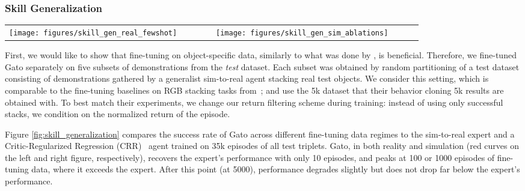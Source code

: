 \documentclass[10pt]{article} \usepackage[accepted]{tmlr}
\newcommand{\model}{{Gato}}
\begin{document}
\subsubsection*{Skill Generalization}
\begin{figure*}[t]
    \vskip -0.5cm
    \centering
    \begin{tabular}{p{0.4\linewidth} p{0.4\linewidth}}
    \vspace{0pt} \texttt{[image: figures/skill\_gen\_real\_fewshot]} &
    \vspace{0pt} \texttt{[image: figures/skill\_gen\_sim\_ablations]}
    \end{tabular}
    \caption{
    {\bf Robotics fine-tuning results.}
    Left: Comparison of real robot Skill Generalization success rate averaged across test triplets for \model{},
    expert, and CRR trained on 35k expert episodes (upper bound).
    Right: Comparison of simulated robot Skill Generalization success rate averaged across test triplets for a series of ablations on the number of parameters, including scores for expert and a BC baseline trained on 5k episodes.
    }
    \label{fig:skill_generalization}
\end{figure*}
First, we would like to show that fine-tuning on object-specific data, similarly to what was done by \citet{lee2022spend}, is beneficial.
Therefore, we fine-tuned \model{} separately on five subsets of demonstrations from the \textit{test} dataset.
Each subset was obtained by random partitioning of a test dataset consisting of demonstrations gathered by a generalist sim-to-real agent stacking real test objects.
We consider this setting, which is comparable to the fine-tuning baselines on RGB stacking tasks from~\citep{lee2022spend}; and use the 5k dataset that their behavior cloning 5k results are obtained with.
To best match their experiments, we change our return filtering scheme during training: instead of using only successful stacks, we condition on the normalized return of the episode.


Figure \ref{fig:skill_generalization} compares the success rate of \model{} across different fine-tuning data regimes to the sim-to-real expert and a Critic-Regularized Regression (CRR)~\citep{wang2020critic} agent trained on 35k episodes of all test triplets.
\model{}, in both reality and simulation (red curves on the left and right figure, respectively), recovers the expert's performance with only 10 episodes, and peaks at 100 or 1000 episodes of fine-tuning data, where it exceeds the expert.
After this point (at 5000), performance degrades slightly but does not drop far below the expert's performance.
\end{document}
